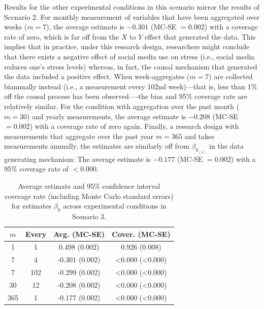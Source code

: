 \documentclass[man]{apa7} %
\begin{document}
Results for the other experimental conditions in this scenario mirror the results of Scenario 2. For monthly measurement of variables that have been aggregated over weeks ($m = 7$), the average estimate is $-0.301$ (MC-SE $= 0.002$) with a coverage rate of zero, which is far off from the $X$ to $Y$ effect that generated the data. This implies that in practice, under this research design, researchers might conclude that there exists a negative effect of social media use on stress (i.e., social media reduces one's stress levels) whereas, in fact, the causal mechanism that generated the data included a positive effect. When week-aggregates ($m = 7$) are collected biannually instead (i.e., a measurement every 102nd week)---that is, less than 1\% off the causal process has been observed----the bias and 95\% coverage rate are relatively similar. For the condition with aggregation over the past month ($m = 30$) and yearly measurements, the average estimate is $-0.208$ (MC-SE $= 0.002$) with a coverage rate of zero again. Finally, a research design with measurements that aggregate over the past year $m = 365$ and takes measurements annually, the estimates are similarly off from $\beta_{0_{(1)}}$ in the data generating mechanism: The average estimate is $-0.177$ (MC-SE $= 0.002$) with a 95\% coverage rate of $< 0.000$. 

 \begin{table}[]
    \centering
    \footnotesize
    \begin{tabular}[t]{cccc}
        \toprule
        $m$ & Every & Avg. (MC-SE) & Cover. (MC-SE)\\
        \midrule
        1 & 1 & 0.498 (0.002) & 0.926 (0.008)\\
        7 & 4 & -0.301 (0.002) & <0.000 (<0.000)\\
        7 & 102 & -0.299 (0.002) & <0.000 (<0.000)\\
        30 & 12 & -0.208 (0.002) & <0.000 (<0.000)\\
        365 & 1 & -0.177 (0.002) & <0.000 (<0.000)\\
        \bottomrule
    \end{tabular}
    \caption{Average estimate and 95\% confidence interval coverage rate (including Monte Carlo standard errors) for estimates $\beta_{0}$ across experimental conditions in Scenario 3.}
    \label{tab:scenario3-results}
\end{table}
\end{document}
